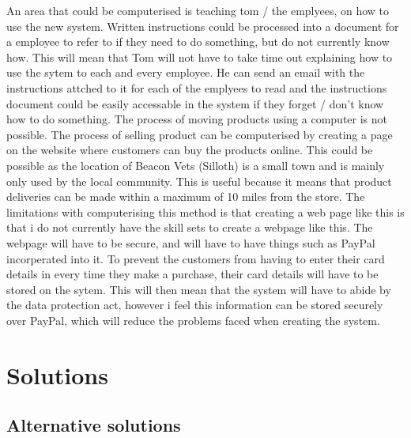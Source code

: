 \begin{flushleft}
An area that could be computerised is teaching tom / the emplyees, on how to use the new system. Written instructions could be processed into a document for a employee to refer to if they need to do something, but do not currently know how. This will mean that Tom will not have to take time out explaining how to use the sytem to each and every employee. He can send an email with the instructions attched to it for each of the emplyees to read and the instructions document could be easily accessable in the system if they forget / don't know how to do something. The process of moving products using a computer is not possible. The process of selling product can be computerised by creating a page on the website where customers can buy the products online. This could be possible as the location of Beacon Vets (Silloth) is a small town and is mainly only used by the local community. This is useful because it means that product deliveries can be made within a maximum of 10 miles from the store. The limitations with computerising this method is that creating a web page like this is that i do not currently have the skill sets to create a webpage like this. The webpage will have to be secure, and will have to have things such as PayPal incorperated into it. To prevent the customers from having to enter their card details in every time they make a purchase, their card details will have to be stored on the sytem. This will then mean that the system will have to abide by the data protection act, however i feel this information can be stored securely over PayPal, which will reduce the problems faced when creating the system.
\end{flushleft}

\section{Solutions}

\subsection{Alternative solutions}



